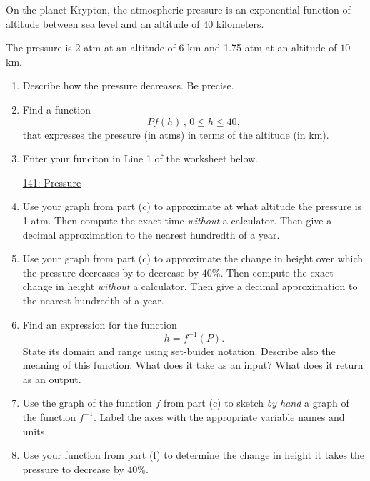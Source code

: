 \documentclass{ximera}
\begin{document}
\begin{question}  \label{Q:dfr5545656565}
On the planet Krypton, the atmospheric pressure is an exponential function of altitude between sea level and an altitude of 40 kilometers.

The pressure is 2 atm at an altitude of $6$ km and 1.75 atm at an altitude of $10$ km. 

\begin{enumerate}
\item Describe how the pressure decreases. Be precise.

\item  Find a function 
\[
 P f(h) \, , \, 0\leq h \leq 40 ,
\]
that expresses the pressure (in atms) in terms of the altitude (in km).

\item Enter your funciton in Line 1 of the worksheet below. 

\begin{onlineOnly}
    \begin{center}
\end{center}
\end{onlineOnly}


\href{https://www.desmos.com/calculator/zchjllaftd}{141: Pressure}



\item Use your graph from part (c) to approximate at what altitude the pressure is 1 atm. Then compute the exact time \emph{without} a calculator. Then give a decimal approximation to the nearest hundredth of a year.

\item Use your graph from part (c) to approximate the change in height over which the pressure decreases by to decrease by $40\%$. Then compute the exact change in height \emph{without} a calculator. Then give a decimal approximation to the nearest hundredth of a year.

\item Find an expression for the function 
\[ 
      h  = f^{-1}(P) .
\]
State its domain and range using set-buider notation. Describe also the meaning of this function. What does it take as an input? What does it return as an output.

\item Use the graph of the function $f$ from part (c) to sketch \emph{by hand} a graph of the function $f^{-1}$. Label the axes with the appropriate variable names and units.

\item Use your function from part (f) to determine the change in height it takes the pressure to decrease by $40\%$.

\end{enumerate}
\end{question}
\end{document}
